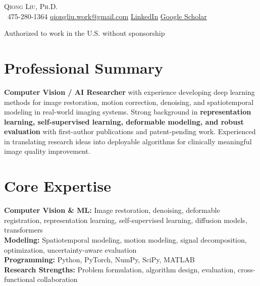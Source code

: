 \begin{center}
{\Huge \scshape Qiong Liu, Ph.D.} \\ \vspace{4pt}
\small
\faPhone\ 475-280-1364 \quad
\href{mailto:qiongliu.work@gmail.com}{qiongliu.work@gmail.com} \quad
\href{https://www.linkedin.com/in/qiong-l-529b23196}{LinkedIn} \quad
\href{https://scholar.google.com/citations?user=SvnpHCkAAAAJ&hl=en}{Google Scholar}

Authorized to work in the U.S. without sponsorship
\end{center}

\section{Professional Summary}
\textbf{Computer Vision / AI Researcher} with experience developing deep learning methods for image restoration, motion correction, denoising, and spatiotemporal modeling in real-world imaging systems. Strong background in \textbf{representation learning, self-supervised learning, deformable modeling, and robust evaluation} with first-author publications and patent-pending work. Experienced in translating research ideas into deployable algorithms for clinically meaningful image quality improvement.

\section{Core Expertise}
\textbf{Computer Vision \& ML:} Image restoration, denoising, deformable registration, representation learning, self-supervised learning, diffusion models, transformers \\
\textbf{Modeling:} Spatiotemporal modeling, motion modeling, signal decomposition, optimization, uncertainty-aware evaluation \\
\textbf{Programming:} Python, PyTorch, NumPy, SciPy, MATLAB \\
\textbf{Research Strengths:} Problem formulation, algorithm design, evaluation, cross-functional collaboration

